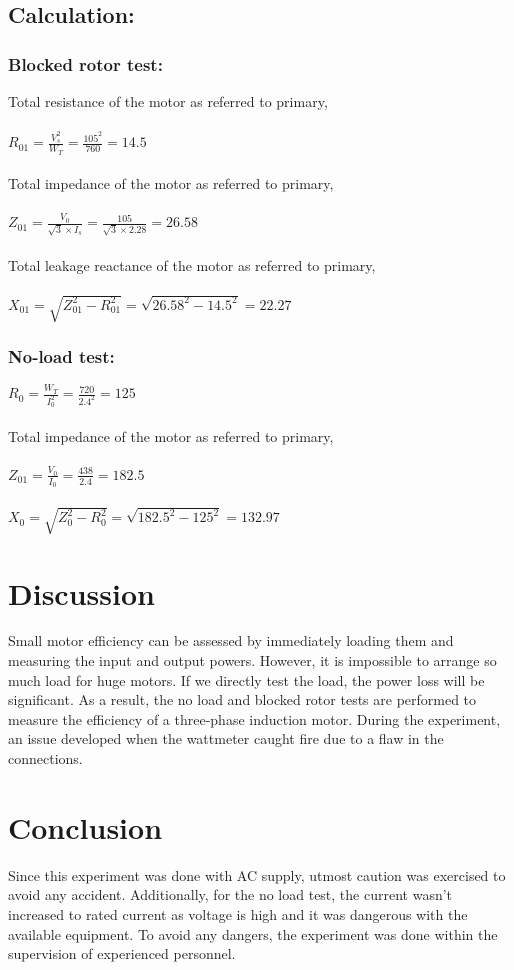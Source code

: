 \documentclass[12pt]{article}
\begin{document}
\subsection{Calculation:}
\subsubsection*{Blocked rotor test:}
Total resistance of the motor as referred to primary,\\\\
\(R_{01} = \frac{V_s^2}{W_T} = \frac{105^2}{760}=14.5\)\\\\
Total impedance of the motor as referred to primary,\\\\
\(Z_{01} = \frac{V_0}{\sqrt{3}\times I_s} = \frac{105}{\sqrt{3} \times 2.28}=26.58\)\\\\
Total leakage reactance of the motor as referred to primary,\\\\
\(X_{01} = \sqrt{Z_{01}^2 - R_{01}^2} = \sqrt{26.58^2 - 14.5^2}= 22.27\)

\subsubsection*{No-load test:}
\(R_{0} = \frac{W_T}{I_0^2} = \frac{720}{2.4^2}=125\)\\\\
Total impedance of the motor as referred to primary,\\\\
\(Z_{01} = \frac{V_0}{I_0} = \frac{438}{2.4} = 182.5\)\\\\
\(X_{0} = \sqrt{Z_0^2 - R_0^2} = \sqrt{182.5^2 - 125^2}= 132.97\)


\section{Discussion}
Small motor efficiency can be assessed by immediately loading them and measuring the input and output powers. However, it is impossible to arrange so much load for huge motors. If we directly test the load, the power loss will be significant. As a result, the no load and blocked rotor tests are performed to measure the efficiency of a three-phase induction motor. During the experiment, an issue developed when the wattmeter caught fire due to a flaw in the connections.


\section{Conclusion}
Since this experiment was done with AC supply, utmost caution was exercised to avoid any accident. Additionally, for the no load test, the current wasn't increased to rated current as voltage is high and it was dangerous with the available equipment. To avoid any dangers, the experiment was done within the supervision of experienced personnel.



\end{document}
